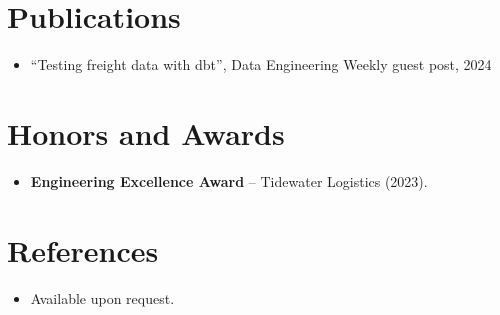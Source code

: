 \documentclass[11pt,a4paper,sans]{moderncv}
\begin{document}
\section{Publications}
\vspace{4pt}
\begin{itemize}
\item {``Testing freight data with dbt'', Data Engineering Weekly guest post, 2024}
\end{itemize}

\section{Honors and Awards}
\vspace{4pt}
\begin{itemize}
\item{\textbf{Engineering Excellence Award} -- Tidewater Logistics (2023).}
\end{itemize}

\section{References}
\vspace{4pt}
\begin{itemize}
\item{Available upon request.}
\end{itemize}
\end{document}
